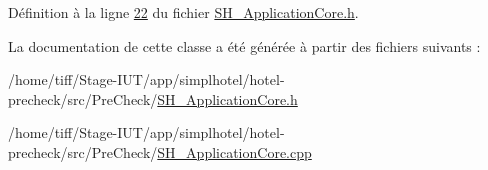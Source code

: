 Définition à la ligne \hyperlink{SH__ApplicationCore_8h_source_l00022}{22} du fichier \hyperlink{SH__ApplicationCore_8h_source}{S\-H\-\_\-\-Application\-Core.\-h}.



La documentation de cette classe a été générée à partir des fichiers suivants \-:\begin{DoxyCompactItemize}
\item 
/home/tiff/\-Stage-\/\-I\-U\-T/app/simplhotel/hotel-\/precheck/src/\-Pre\-Check/\hyperlink{SH__ApplicationCore_8h}{S\-H\-\_\-\-Application\-Core.\-h}\item 
/home/tiff/\-Stage-\/\-I\-U\-T/app/simplhotel/hotel-\/precheck/src/\-Pre\-Check/\hyperlink{SH__ApplicationCore_8cpp}{S\-H\-\_\-\-Application\-Core.\-cpp}\end{DoxyCompactItemize}
